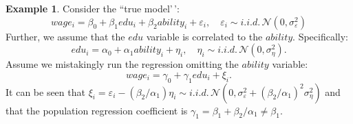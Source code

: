 \documentclass[
]{book}
\theoremstyle{definition}
\theoremstyle{definition}
\newtheorem{example}{Example}[chapter]
\theoremstyle{definition}
\theoremstyle{definition}
\theoremstyle{remark}
\begin{document}
\begin{example}
\protect\hypertarget{exm:wageeduc}{}\label{exm:wageeduc}Consider the ``true model'\,':
\begin{equation}
wage_i = \beta_0 +\beta_1 edu_i + \beta_2 ability_i + \varepsilon_i, \quad \varepsilon_i \sim i.i.d.\,\mathcal{N}(0,\sigma_\varepsilon^2)
\end{equation}
Further, we assume that the \(edu\) variable is correlated to the \(ability\). Specifically:
\[
edu_i = \alpha_0 +\alpha_1 ability_i + \eta_i, \quad \eta_i \sim i.i.d.\,\mathcal{N}(0,\sigma_\eta^2).
\]
Assume we mistakingly run the regression omitting the \(ability\) variable:
\begin{equation}
wage_i = \gamma_0 +\gamma_1 edu_i + \xi_i.
\end{equation}
It can be seen that \(\xi_i = \varepsilon_i - (\beta_2/\alpha_1) \eta_i \sim i.i.d.\,\mathcal{N}(0,\sigma_\varepsilon^2+(\beta_2/\alpha_1)^2\sigma_\eta^2)\) and that the population regression coefficient is \(\gamma_1 = \beta_1 + \beta_2/\alpha_1 \ne \beta_1\).
\end{example}
\end{document}
